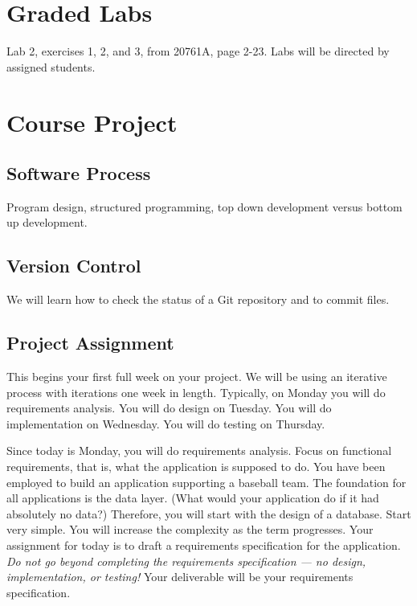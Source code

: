 \documentclass{article}
\begin{document}
    \section{Graded Labs}

Lab 2, exercises 1, 2, and 3, from 20761A, page 2-23. Labs will be directed by assigned students.


    \section{Course Project}

        \subsection{Software Process}

        Program design, structured programming, top down development versus bottom up development. 
        
        \subsection{Version Control}

        We will learn how to check the status of a Git repository and to commit files.

        \subsection{Project Assignment}

        This begins your first full week on your project. We will be using an iterative process with iterations one week in length. Typically, on Monday you will do requirements analysis. You will do design on Tuesday. You will do implementation on Wednesday. You will do testing on Thursday.

        Since today is Monday, you will do requirements analysis. Focus on functional requirements, that is, what the application is supposed to do. You have been employed to build an application supporting a baseball team. The foundation for all applications is the data layer. (What would your application do if it had absolutely no data?) Therefore, you will start with the design of a database. Start very simple. You will increase the complexity as the term progresses. Your assignment for today is to draft a requirements specification for the application. \textit{Do not go beyond completing the requirements specification --- no design, implementation, or testing!} Your deliverable will be your requirements specification.
\end{document}
